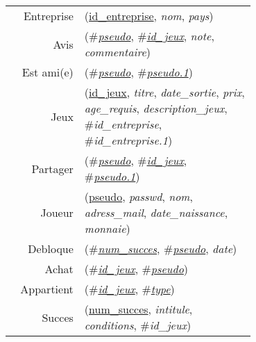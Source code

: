 
\usepackage[normalem]{ulem}
\newenvironment{mld}
  {\par\begin{minipage}{\linewidth}\begin{tabular}{rp{0.7\linewidth}}}
  {\end{tabular}\end{minipage}\par}
\newcommand{\relat}[1]{\textsc{#1}}
\newcommand{\attr}[1]{\emph{#1}}
\newcommand{\prim}[1]{\uline{#1}}
\newcommand{\foreign}[1]{\#\textsl{#1}}


\begin{mld}
  Entreprise & (\prim{id\_entreprise}, \attr{nom}, \attr{pays})\\
  Avis & (\foreign{\prim{pseudo}}, \foreign{\prim{id\_jeux}}, \attr{note}, \attr{commentaire})\\
  Est ami(e) & (\foreign{\prim{pseudo}}, \foreign{\prim{pseudo.1}})\\
  Jeux & (\prim{id\_jeux}, \attr{titre}, \attr{date\_sortie}, \attr{prix}, \attr{age\_requis}, \attr{description\_jeux}, \foreign{id\_entreprise}, \foreign{id\_entreprise.1})\\
  Partager & (\foreign{\prim{pseudo}}, \foreign{\prim{id\_jeux}}, \foreign{\prim{pseudo.1}})\\
  Joueur & (\prim{pseudo}, \attr{passwd}, \attr{nom}, \attr{adress\_mail}, \attr{date\_naissance}, \attr{monnaie})\\
  Debloque & (\foreign{\prim{num\_succes}}, \foreign{\prim{pseudo}}, \attr{date})\\
  Achat & (\foreign{\prim{id\_jeux}}, \foreign{\prim{pseudo}})\\
  Appartient & (\foreign{\prim{id\_jeux}}, \foreign{\prim{type}})\\
  Succes & (\prim{num\_succes}, \attr{intitule}, \attr{conditions}, \foreign{id\_jeux})\\
\end{mld}